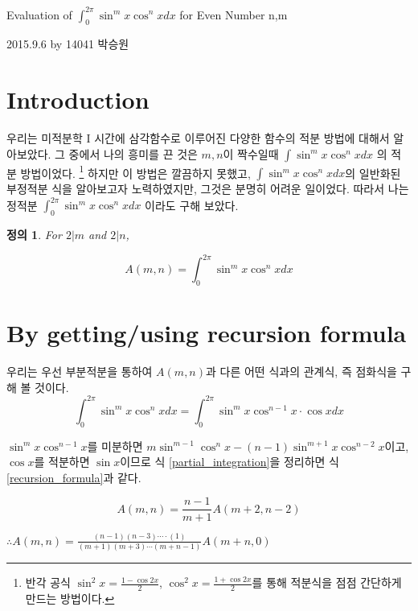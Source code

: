 \documentclass[11pt]{article}
\newtheorem{definition}{정의}
\begin{document}
\begin{center}
	\Large Evaluation of $\int_{0}^{2\pi}{\sin^m x \cos^n xdx}$ for Even Number n,m
\end{center}
\begin{flushright}
	2015.9.6 by 14041 박승원
\end{flushright}
\tableofcontents

\section{Introduction}

우리는 미적분학 I 시간에 삼각함수로 이루어진 다양한 함수의 적분 방법에 대해서 알아보았다. 그 중에서 나의 흥미를 끈 것은 $m,n$이 짝수일때 $\int{\sin^m x \cos^n xdx}$ 의 적분 방법이었다.
\footnote{반각 공식 $\sin^2 x = \frac{1-\cos2x}{2}$, $\cos^2 x = \frac{1+\cos 2x}{2}$를 통해 적분식을 점점 간단하게 만드는 방법이다.} 하지만 이 방법은 깔끔하지 못했고, $\int{\sin^m x \cos^n xdx}$의 일반화된 부정적분 식을 알아보고자 노력하였지만, 그것은 분명히 어려운 일이었다. 따라서 나는 정적분 $\int_{0}^{2\pi}{\sin^m x \cos^n xdx}$ 이라도 구해 보았다.

\begin{definition}
	For $2|m$ and $2|n$,
	
	$$ A(m,n) = \int_{0}^{2\pi}{\sin^m x \cos^n xdx} $$
\end{definition}

\section{By getting/using recursion formula} \label{recursion}
우리는 우선 부분적분을 통하여 $A(m,n)$과 다른 어떤 식과의 관계식, 즉 점화식을 구해 볼 것이다.
\begin{equation} \label{partial_integration}
\int_{0}^{2\pi}{\sin^m x \cos^n xdx} = \int_{0}^{2\pi}{\sin^m x \cos^{n-1} x \cdot \cos x dx}
\end{equation}


$\sin^m x\cos^{n-1} x$를 미분하면
$m\sin^{m-1}\cos^n x - (n-1)\sin^{m+1}x\cos^{n-2}x$이고,
$\cos x$를 적분하면 $\sin x$이므로 식 \ref{partial_integration}을 정리하면 식 \ref{recursion_formula}과 같다.

\begin{equation} \label{recursion_formula}
A(m,n)=\frac{n-1}{m+1}A(m+2,n-2)
\end{equation}

$\therefore A(m,n)=\frac{(n-1)(n-3)\cdots\cdot(1)}{(m+1)(m+3)\cdots(m+n-1)}A(m+n,0)$
\end{document}
